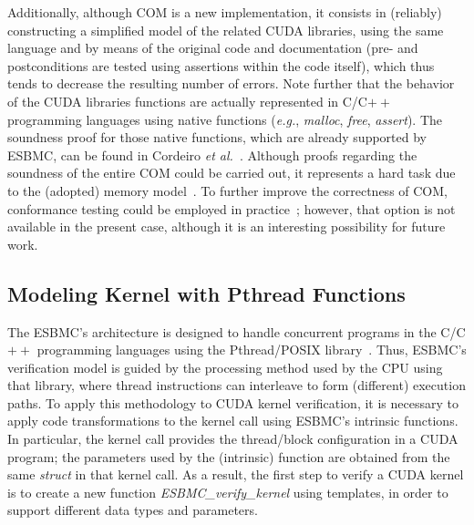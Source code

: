 \documentclass[times, doublespace]{cpeauth}
\begin{document}
Additionally, although COM is a new implementation, it consists in (reliably) constructing a simplified model of the related CUDA libraries, using the same language and by means of the original code and documentation (pre- and postconditions are tested using assertions within the code itself), which thus tends to decrease the resulting number of errors. Note further that the behavior of the CUDA libraries functions are actually represented in C/C$++$ programming languages using native functions ({\it e.g.}, \textit{malloc}, \textit{free}, \textit{assert}). The soundness proof for those native functions, which are already supported by ESBMC, can be found in Cordeiro {\it et al.}~\cite{cordeiro:2011,cordeiro:2012}. Although proofs regarding the soundness of the entire COM could be carried out, it represents a hard task due to the (adopted) memory model~\cite{Mehtaa:2005}. To further improve the correctness of COM, conformance testing could be employed in practice~\cite{Pedro:2011,Pedro:2009}; however, that option is not available in the present case, although it is an interesting possibility for future work.

\subsection{Modeling Kernel with Pthread Functions}
\vspace{-2pt}
\label{sec:pthreadkernels}

The ESBMC's architecture is designed to handle concurrent programs in the C/C$++$ programming languages using the Pthread/POSIX library~\cite{posix:2008}. Thus, ESBMC's verification model is guided by the processing method used by the CPU using that library, where thread instructions can interleave to form (different) execution paths. To apply this methodology to CUDA kernel verification, it is necessary to apply code transformations to the kernel call using ESBMC's intrinsic functions. In particular, the kernel call provides the thread/block configuration in a CUDA program; the parameters used by the (intrinsic) function are obtained from the same \textit{struct} in that kernel call. As a result, the first step to verify a CUDA kernel is to create a new function \textit{ESBMC\_verify\_kernel} using templates, in order to support different data types and parameters.
\end{document}

